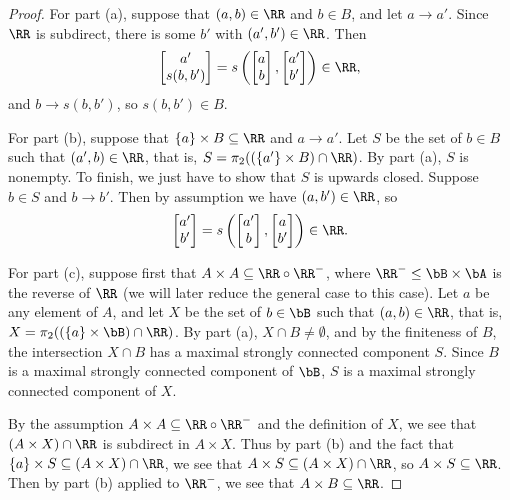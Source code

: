 \begin{proof} For part (a), suppose that $(a,b) \in \RR$ and $b \in B$, and let $a \rightarrow a'$. Since $\RR$ is subdirect, there is some $b'$ with $(a',b') \in \RR$. Then
\[
\begin{bmatrix} a'\\ s(b,b')\end{bmatrix} = s\left(\begin{bmatrix} a\\ b\end{bmatrix}, \begin{bmatrix} a'\\ b'\end{bmatrix}\right) \in \RR,
\]
and $b \rightarrow s(b,b')$, so $s(b,b') \in B$.

For part (b), suppose that $\{a\}\times B \subseteq \RR$ and $a \rightarrow a'$. Let $S$ be the set of $b \in B$ such that $(a',b) \in \RR$, that is, $S = \pi_2((\{a'\}\times B) \cap \RR)$. By part (a), $S$ is nonempty. To finish, we just have to show that $S$ is upwards closed. Suppose $b \in S$ and $b \rightarrow b'$. Then by assumption we have $(a,b') \in \RR$, so
\[
\begin{bmatrix} a'\\ b'\end{bmatrix} = s\left(\begin{bmatrix} a'\\ b\end{bmatrix}, \begin{bmatrix} a\\ b'\end{bmatrix}\right) \in \RR.
\]

For part (c), suppose first that $A \times A \subseteq \RR\circ \RR^-$, where $\RR^- \le \bB \times \bA$ is the reverse of $\RR$ (we will later reduce the general case to this case). Let $a$ be any element of $A$, and let $X$ be the set of $b \in \bB$ such that $(a,b) \in \RR$, that is, $X = \pi_2((\{a\}\times \bB) \cap \RR)$. By part (a), $X \cap B \ne \emptyset$, and by the finiteness of $B$, the intersection $X \cap B$ has a maximal strongly connected component $S$. Since $B$ is a maximal strongly connected component of $\bB$, $S$ is a maximal strongly connected component of $X$.

By the assumption $A \times A \subseteq \RR\circ \RR^-$ and the definition of $X$, we see that $(A\times X)\cap \RR$ is subdirect in $A\times X$. Thus by part (b) and the fact that $\{a\} \times S \subseteq (A\times X)\cap \RR$, we see that $A \times S \subseteq (A\times X)\cap \RR$, so $A \times S \subseteq \RR$. Then by part (b) applied to $\RR^-$, we see that $A \times B \subseteq \RR$.


\end{proof}
